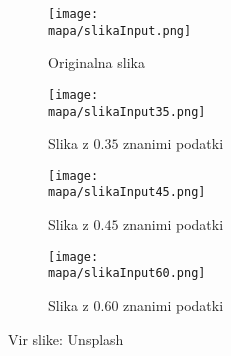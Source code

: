 \renewcommand{\mapa}{Poglavja/Slike/grayscale1000}

\begin{figure}[!ht]
    \centering
    \begin{subfigure}{0.49\linewidth}
        \texttt{[image: \\mapa/slikaInput.png]}
        \caption{Originalna slika}
    \end{subfigure}
    \hfill
    \begin{subfigure}{0.49\linewidth}
        \texttt{[image: \\mapa/slikaInput35.png]}
        \caption{Slika z $0.35$ znanimi podatki}
    \end{subfigure}
    \begin{subfigure}{0.49\linewidth}
        \texttt{[image: \\mapa/slikaInput45.png]}
        \caption{Slika z $0.45$ znanimi podatki}
    \end{subfigure}
    \hfill
    \begin{subfigure}{0.49\linewidth}
        \texttt{[image: \\mapa/slikaInput60.png]}
        \caption{Slika z $0.60$ znanimi podatki}
    \end{subfigure}
    \caption{Vir slike: Unsplash}
\end{figure}

